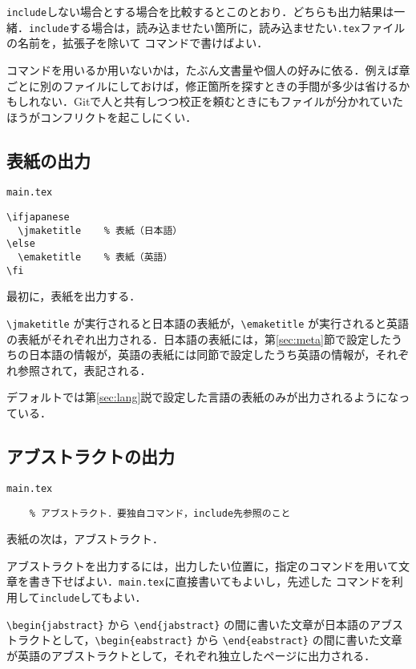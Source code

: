 {\tt include}しない場合とする場合を比較するとこのとおり．どちらも出力結果は一緒．{\tt include}する場合は，読み込ませたい箇所に，読み込ませたい{\tt *.tex}ファイルの名前を，拡張子を除いて \verb|| コマンドで書けばよい．

\verb|| コマンドを用いるか用いないかは，たぶん文書量や個人の好みに依る．例えば章ごとに別のファイルにしておけば，修正箇所を探すときの手間が多少は省けるかもしれない．Gitで人と共有しつつ校正を頼むときにもファイルが分かれていたほうがコンフリクトを起こしにくい．


\subsection{表紙の出力}

\begin{itembox}[l]{{\tt main.tex}}
\begin{verbatim}
\ifjapanese
  \jmaketitle    % 表紙（日本語）
\else
  \emaketitle    % 表紙（英語）
\fi
\end{verbatim}
\end{itembox}

最初に，表紙を出力する．

\verb|\jmaketitle| が実行されると日本語の表紙が，\verb|\emaketitle| が実行されると英語の表紙がそれぞれ出力される．日本語の表紙には，第\ref{sec:meta}節で設定したうちの日本語の情報が，英語の表紙には同節で設定したうち英語の情報が，それぞれ参照されて，表記される．

デフォルトでは第\ref{sec:lang}説で設定した言語の表紙のみが出力されるようになっている．

\subsection{アブストラクトの出力}

\begin{itembox}[l]{{\tt main.tex}}
\begin{verbatim}
	% アブストラクト．要独自コマンド，include先参照のこと
\end{verbatim}
\end{itembox}

表紙の次は，アブストラクト．

アブストラクトを出力するには，出力したい位置に，指定のコマンドを用いて文章を書き下せばよい．{\tt main.tex}に直接書いてもよいし，先述した \verb|| コマンドを利用して{\tt include}してもよい．

\verb|\begin{jabstract}| から \verb|\end{jabstract}| の間に書いた文章が日本語のアブストラクトとして，\verb|\begin{eabstract}| から \verb|\end{eabstract}| の間に書いた文章が英語のアブストラクトとして，それぞれ独立したページに出力される．

